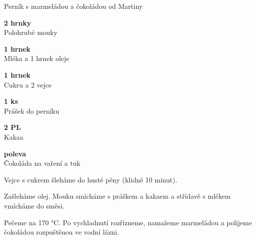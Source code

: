 \documentclass[11pt,a4paper]{article}
\begin{document}
\begin{recipe}[BrickRed]{Perník s marmeládou a čokoládou od Martiny}
    \begin{ingredients}
        \item \parbox[t]{\linewidth}{\raggedright \piece \textbf{2 hrnky}\\ Polohrubé mouky}
        \item \parbox[t]{\linewidth}{\raggedright \liquid \textbf{1 hrnek}\\ Mléka a 1 hrnek oleje}
        \item \parbox[t]{\linewidth}{\raggedright \piece \textbf{1 hrnek}\\ Cukru a 2 vejce}
        \item \parbox[t]{\linewidth}{\raggedright \piece \textbf{1 ks}\\ Prášek do perníku}
        \item \parbox[t]{\linewidth}{\raggedright \spoon \textbf{2 PL}\\ Kakaa}
        \item \parbox[t]{\linewidth}{\raggedright \indefinite \textbf{poleva}\\ Čokoláda na vaření a tuk}
    \end{ingredients}
    \begin{steps}
        \item Vejce s cukrem šleháme do husté pěny (klidně 10 minut).
        \item Zašleháme olej. Mouku smícháme s práškem a kakaem a střídavě s mlékem vmícháme do směsi.
        \item Pečeme na 170 °C. Po vychladnutí rozřízneme, namažeme marmeládou a polijeme čokoládou rozpuštěnou ve vodní lázni.
    \end{steps}
\end{recipe}
\end{document}
